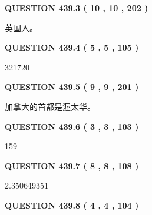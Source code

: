 \documentclass{ctexart}
\begin{document}
{\textbf{\Large{QUESTION
439.3 
 ( 10 , 10 , 202 )
}}}
  
  
 
 
\noindent{}
 
 
英国人。
 
 
 
 
  
\vspace{0.2in}
  
{\textbf{\Large{QUESTION
439.4 
 ( 5 , 5 , 105 )
}}}
  
  
 
 
\noindent{}

321720
 
 
  
\vspace{0.2in}
  
{\textbf{\Large{QUESTION
439.5 
 ( 9 , 9 , 201 )
}}}
  
  
 
 
\noindent{}
 
 
加拿大的首都是渥太华。
 
 
 
 
  
\vspace{0.2in}
  
{\textbf{\Large{QUESTION
439.6 
 ( 3 , 3 , 103 )
}}}
  
  
 
 
\noindent{}

159
 
 
  
\vspace{0.2in}
  
{\textbf{\Large{QUESTION
439.7 
 ( 8 , 8 , 108 )
}}}
  
  
 
 
\noindent{}

2.350649351
 
 
  
\vspace{0.2in}
  
{\textbf{\Large{QUESTION
439.8 
 ( 4 , 4 , 104 )
}}}
  
\end{document}
